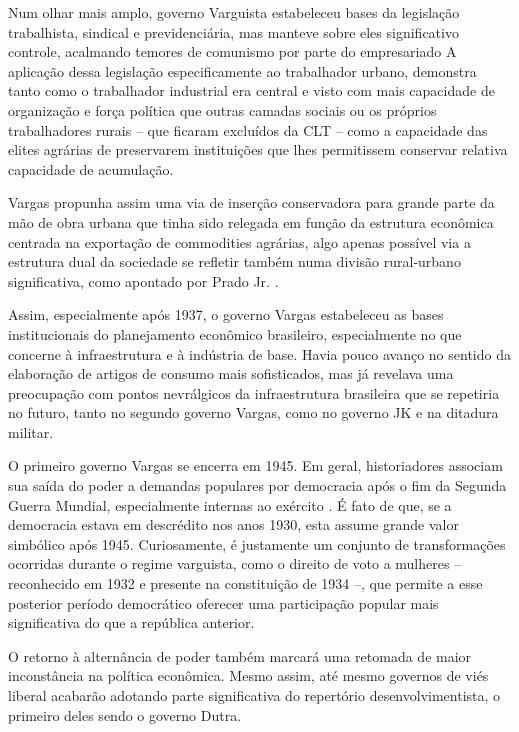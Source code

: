 Num olhar mais amplo, governo Varguista estabeleceu bases da legislação trabalhista, sindical e
previdenciária, mas manteve sobre eles significativo controle,
acalmando temores de comunismo por parte do empresariado \citep[]{schwarcz_brasil_2015}
A aplicação dessa legislação especificamente ao trabalhador urbano,
demonstra tanto como o trabalhador industrial era central e visto com mais
capacidade de organização e força política que outras camadas sociais ou
os próprios trabalhadores rurais -- que ficaram excluídos da CLT -- como a capacidade
das elites agrárias de preservarem instituições que lhes permitissem conservar relativa
capacidade de acumulação.

Vargas propunha assim uma via de inserção conservadora para grande parte da mão
de obra urbana que tinha sido relegada em função da estrutura econômica
centrada na exportação de commodities agrárias, algo apenas possível via
a estrutura dual da sociedade se refletir também numa divisão
rural-urbano significativa, como apontado por Prado Jr. \citep{pradojunior2012}.

Assim, especialmente após 1937, o governo Vargas estabeleceu as bases
institucionais do planejamento econômico brasileiro, especialmente no
que concerne à infraestrutura e à indústria de base. Havia pouco avanço
no sentido da elaboração de artigos de consumo mais sofisticados, mas já
revelava uma preocupação com pontos nevrálgicos da infraestrutura
brasileira que se repetiria no futuro, tanto no segundo governo Vargas,
como no governo JK e na ditadura militar.

O primeiro governo Vargas se encerra em 1945. Em geral, historiadores
associam sua saída do poder a demandas populares por democracia após o
fim da Segunda Guerra Mundial, especialmente internas ao exército
\citep[]{schwarcz_brasil_2015}. É fato de que, se a democracia estava em descrédito nos anos
1930, esta assume grande valor simbólico após 1945. Curiosamente, é
justamente um conjunto de transformações ocorridas durante o regime
varguista, como o direito de voto a mulheres -- reconhecido em 1932 e
presente na constituição de 1934 --, que permite a esse posterior
período democrático oferecer uma participação popular mais significativa
do que a república anterior.

O retorno à alternância de poder também marcará uma retomada de maior
inconstância na política econômica. Mesmo assim, até mesmo governos de
viés liberal acabarão adotando parte significativa do repertório
desenvolvimentista, o primeiro deles sendo o governo Dutra.

